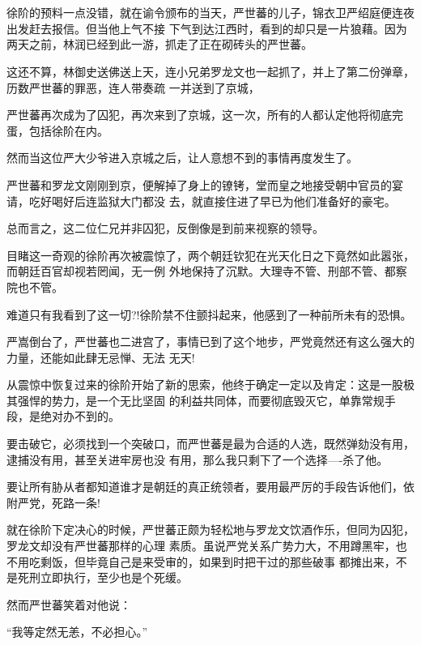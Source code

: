 \documentclass[11pt,a4paper,onecolumn]{article}
\begin{document}
\setcounter{section}{999}
\pagestyle{fancy}


\section[\thesection]{}

徐阶的预料一点没错，就在谕令颁布的当天，严世蕃的儿子，锦衣卫严绍庭便连夜出发赶去报信。但当他上气不接
下气到达江西时，看到的却只是一片狼藉。因为两天之前，林润已经到此一游，抓走了正在砌砖头的严世蕃。

这还不算，林御史送佛送上天，连小兄弟罗龙文也一起抓了，并上了第二份弹章，历数严世蕃的罪恶，连人带奏疏
一并送到了京城，

严世蕃再次成为了囚犯，再次来到了京城，这一次，所有的人都认定他将彻底完蛋，包括徐阶在内。

然而当这位严大少爷进入京城之后，让人意想不到的事情再度发生了。

严世蕃和罗龙文刚刚到京，便解掉了身上的镣铐，堂而皇之地接受朝中官员的宴请，吃好喝好后连监狱大门都没
去，就直接住进了早已为他们准备好的豪宅。

总而言之，这二位仁兄并非囚犯，反倒像是到前来视察的领导。

目睹这一奇观的徐阶再次被震惊了，两个朝廷钦犯在光天化日之下竟然如此嚣张，而朝廷百官却视若罔闻，无一例
外地保持了沉默。大理寺不管、刑部不管、都察院也不管。

难道只有我看到了这一切?!徐阶禁不住颤抖起来，他感到了一种前所未有的恐惧。

严嵩倒台了，严世蕃也二进宫了，事情已到了这个地步，严党竟然还有这么强大的力量，还能如此肆无忌惮、无法
无天!

从震惊中恢复过来的徐阶开始了新的思索，他终于确定一定以及肯定：这是一股极其强悍的势力，是一个无比坚固
的利益共同体，而要彻底毁灭它，单靠常规手段，是绝对办不到的。

要击破它，必须找到一个突破口，而严世蕃是最为合适的人选，既然弹劾没有用，逮捕没有用，甚至关进牢房也没
有用，那么我只剩下了一个选择----杀了他。

要让所有胁从者都知道谁才是朝廷的真正统领者，要用最严厉的手段告诉他们，依附严党，死路一条!

就在徐阶下定决心的时候，严世蕃正颇为轻松地与罗龙文饮酒作乐，但同为囚犯，罗龙文却没有严世蕃那样的心理
素质。虽说严党关系广势力大，不用蹲黑牢，也不用吃剩饭，但毕竟自己是来受审的，如果到时把干过的那些破事
都摊出来，不是死刑立即执行，至少也是个死缓。

然而严世蕃笑着对他说：

``我等定然无恙，不必担心。''
\end{document}

